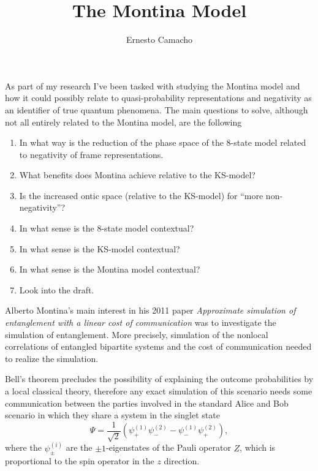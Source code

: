\documentclass[12pt,draft]{article}
\title{The Montina Model}
\author{Ernesto Camacho}
\theoremstyle{definition}
\theoremstyle{plain}
\begin{document}
    \maketitle

    As part of my research I've been tasked with studying
    the Montina model and how it could possibly relate to
    quasi-probability representations and negativity as an
    identifier of true quantum phenomena. The main questions
    to solve, although not all entirely related to the
    Montina model, are the following
    \begin{enumerate}
        \item In what way is the reduction of the phase
            space of the 8-state model related to negativity
            of frame representations.
        \item What benefits does Montina achieve relative to
            the KS-model?
        \item Is the increased ontic space (relative to the
            KS-model) for ``more non-negativity''?
        \item In what sense is the 8-state model contextual?
        \item In what sense is the KS-model contextual?
        \item In what sense is the Montina model contextual?
        \item Look into the draft.
    \end{enumerate}

    Alberto Montina's main interest in his 2011 paper
    \textit{Approximate simulation of entanglement with a
    linear cost of communication} was to investigate the
    simulation of entanglement. More precisely, simulation
    of the nonlocal correlations of entangled bipartite
    systems and the cost of communication needed to realize
    the simulation.

    Bell's theorem precludes the possibility of explaining
    the outcome probabilities by a local classical theory,
    therefore any exact simulation of this scenario needs
    some communication between the parties involved in the
    standard Alice and Bob scenario in which they share a
    system in the singlet state
    \begin{equation}
        \Psi
        = \frac{1}{\sqrt{2}}\left(
            \psi^{(1)}_{+}\psi^{(2)}_{-}
        - \psi^{(1)}_{-}\psi^{(2)}_{+}\right),
    \end{equation}
    where the $\psi^{(i)}_{\pm}$ are the $\pm 1$-eigenstates
    of the Pauli operator $Z$, which is proportional to the
    spin operator in the $z$ direction.
\end{document}

